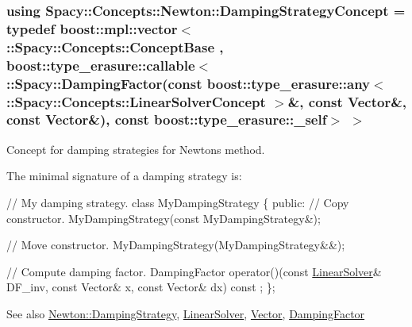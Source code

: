 \subsubsection[{Damping\+Strategy\+Concept}]{\setlength{\rightskip}{0pt plus 5cm}using {\bf Spacy\+::\+Concepts\+::\+Newton\+::\+Damping\+Strategy\+Concept} = typedef boost\+::mpl\+::vector$<$ \+::{\bf Spacy\+::\+Concepts\+::\+Concept\+Base} , boost\+::type\+\_\+erasure\+::callable$<$ \+::{\bf Spacy\+::\+Damping\+Factor}(const boost\+::type\+\_\+erasure\+::any$<$ \+::{\bf Spacy\+::\+Concepts\+::\+Linear\+Solver\+Concept} $>$\&, const Vector\&, const Vector\&), const boost\+::type\+\_\+erasure\+::\+\_\+self$>$ $>$}\label{group__NewtonConceptGroup_ga8da917ba6de9c283c1509281956bb04a_ga8da917ba6de9c283c1509281956bb04a}


Concept for damping strategies for Newton\textquotesingle{}s method. 

\label{group__NewtonConceptGroup_ga8da917ba6de9c283c1509281956bb04a_Newton_DampingStrategyConceptAnchor}%
\hypertarget{group__NewtonConceptGroup_ga8da917ba6de9c283c1509281956bb04a_Newton_DampingStrategyConceptAnchor}{}%
The minimal signature of a damping strategy is\+: 
\begin{DoxyCode}
\textcolor{comment}{// My damping strategy.}
\textcolor{keyword}{class }MyDampingStrategy
\{
\textcolor{keyword}{public}:
  \textcolor{comment}{// Copy constructor.}
  MyDampingStrategy(\textcolor{keyword}{const} MyDampingStrategy&);

  \textcolor{comment}{// Move constructor.}
  MyDampingStrategy(MyDampingStrategy&&);

  \textcolor{comment}{// Compute damping factor.}
  DampingFactor operator()(\textcolor{keyword}{const} \hyperlink{namespaceSpacy_a7d5cd1c6fb9dd85aa345b536caf30bba_a7d5cd1c6fb9dd85aa345b536caf30bba}{LinearSolver}& DF\_inv, \textcolor{keyword}{const} Vector& x, \textcolor{keyword}{const} Vector& dx) \textcolor{keyword}{const}
      ;
\};
\end{DoxyCode}


\begin{DoxySeeAlso}{See also}
\hyperlink{namespaceSpacy_1_1Newton_ae2ba8821b209bfac2ab9190e6283cf06_Newton_DampingStrategyAnchor}{Newton\+:\+:Damping\+Strategy}, \hyperlink{namespaceSpacy_a7d5cd1c6fb9dd85aa345b536caf30bba_LinearSolverAnchor}{Linear\+Solver}, \hyperlink{group__SpacyGroup_gafc144d2730ef87a67e54f8cd750b1f54_VectorAnchor}{Vector}, \hyperlink{classSpacy_1_1DampingFactor}{Damping\+Factor} 
\end{DoxySeeAlso}
\hypertarget{group__NewtonConceptGroup_ga7d7604bea8b7c261d3179a7e95ffbe76_ga7d7604bea8b7c261d3179a7e95ffbe76}{}
